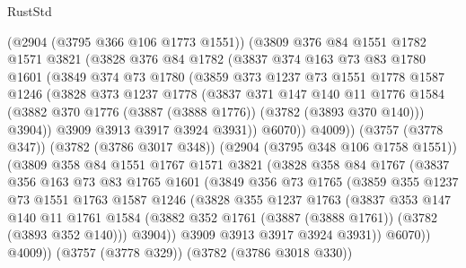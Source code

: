 \begin{lexlean}{RustStd}
\begin{coremodule}
          (@2904 (@3795 @366 @106 @1773 @1551))
          (@3809
            @376
            @84
            @1551
            @1782
            @1571
            @3821
            (@3828
              @376
              @84
              @1782
              (@3837
                @374
                @163
                @73
                @83
                @1780
                @1601
                (@3849
                  @374
                  @73
                  @1780
                  (@3859
                    @373
                    @1237
                    @73
                    @1551
                    @1778
                    @1587
                    @1246
                    (@3828
                      @373
                      @1237
                      @1778
                      (@3837
                        @371
                        @147
                        @140
                        @11
                        @1776
                        @1584
                        (@3882 @370 @1776 (@3887 (@3888 @1776)) (@3782 (@3893 @370 @140)))
                        @3904))
                    @3909
                    @3913
                    @3917
                    @3924
                    @3931))
                @6070))
            @4009))
        (@3757 (@3778 @347))
        (@3782 (@3786 @3017 @348))
        (@2904 (@3795 @348 @106 @1758 @1551))
        (@3809
          @358
          @84
          @1551
          @1767
          @1571
          @3821
          (@3828
            @358
            @84
            @1767
            (@3837
              @356
              @163
              @73
              @83
              @1765
              @1601
              (@3849
                @356
                @73
                @1765
                (@3859
                  @355
                  @1237
                  @73
                  @1551
                  @1763
                  @1587
                  @1246
                  (@3828
                    @355
                    @1237
                    @1763
                    (@3837
                      @353
                      @147
                      @140
                      @11
                      @1761
                      @1584
                      (@3882 @352 @1761 (@3887 (@3888 @1761)) (@3782 (@3893 @352 @140)))
                      @3904))
                  @3909
                  @3913
                  @3917
                  @3924
                  @3931))
              @6070))
          @4009))
      (@3757 (@3778 @329))
      (@3782 (@3786 @3018 @330))

\end{coremodule}
\end{lexlean}

